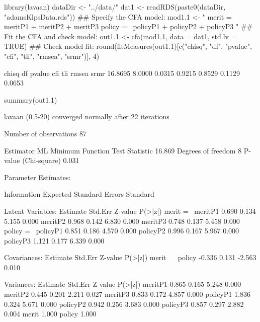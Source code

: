 \begin{Schunk}
\begin{Sinput}
 library(lavaan)
 dataDir <- "../data/"
 dat1 <- readRDS(paste0(dataDir, "adamsKlpsData.rds"))
 ## Specify the CFA model:
 mod1.1 <- "
 merit =~ meritP1 + meritP2 + meritP3
 policy =~ policyP1 + policyP2 + policyP3
 "
 ## Fit the CFA and check model:
 out1.1 <- cfa(mod1.1, data = dat1, std.lv = TRUE)
 ## Check model fit:
 round(fitMeasures(out1.1)[c("chisq", "df", "pvalue", "cfi", 
                             "tli", "rmsea", "srmr")], 4)
\end{Sinput}
\begin{Soutput}
  chisq      df  pvalue     cfi     tli   rmsea    srmr 
16.8695  8.0000  0.0315  0.9215  0.8529  0.1129  0.0653 
\end{Soutput}
\begin{Sinput}
 summary(out1.1)
\end{Sinput}
\begin{Soutput}
lavaan (0.5-20) converged normally after  22 iterations

  Number of observations                            87

  Estimator                                         ML
  Minimum Function Test Statistic               16.869
  Degrees of freedom                                 8
  P-value (Chi-square)                           0.031

Parameter Estimates:

  Information                                 Expected
  Standard Errors                             Standard

Latent Variables:
                   Estimate  Std.Err  Z-value  P(>|z|)
  merit =~                                            
    meritP1           0.690    0.134    5.155    0.000
    meritP2           0.968    0.142    6.830    0.000
    meritP3           0.748    0.137    5.458    0.000
  policy =~                                           
    policyP1          0.851    0.186    4.570    0.000
    policyP2          0.996    0.167    5.967    0.000
    policyP3          1.121    0.177    6.339    0.000

Covariances:
                   Estimate  Std.Err  Z-value  P(>|z|)
  merit ~~                                            
    policy           -0.336    0.131   -2.563    0.010

Variances:
                   Estimate  Std.Err  Z-value  P(>|z|)
    meritP1           0.865    0.165    5.248    0.000
    meritP2           0.445    0.201    2.211    0.027
    meritP3           0.833    0.172    4.857    0.000
    policyP1          1.836    0.324    5.671    0.000
    policyP2          0.942    0.256    3.683    0.000
    policyP3          0.857    0.297    2.882    0.004
    merit             1.000                           
    policy            1.000                           
\end{Soutput}
\end{Schunk}
